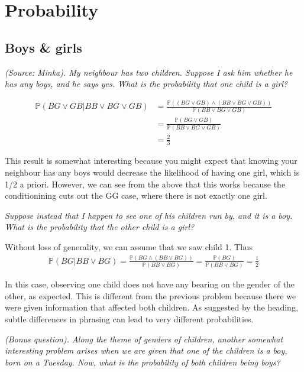\section{Probability}
\subsection{Boys \& girls}
\textit{(Source: Minka). My neighbour has two children. Suppose I ask him whether he has any boys, and he says yes. What is the probability that one child is a girl?}

\begin{align*}
\mathbb{P}(BG \lor GB | BB \lor BG \lor GB) &= \frac{\mathbb{P}((BG \lor GB) \land (BB \lor BG \lor GB))}{\mathbb{P}(BB \lor BG \lor GB)} \\
&= \frac{\mathbb{P}(BG \lor GB)}{\mathbb{P}(BB \lor BG \lor GB)} \\
&= \frac{2}{3}
\end{align*}

This result is somewhat interesting because you might expect that knowing your neighbour has any boys would decrease the likelihood of having one girl, which is 1/2 a priori. However, we can see from the above that this works because the conditionining cuts out the GG case, where there is not exactly one girl.

\textit{Suppose instead that I happen to see one of his children run by, and it is a boy. What is the probability that the other child is a girl?}

Without loss of generality, we can assume that we saw child 1. Thus
\begin{gather*}
\mathbb{P}(BG | BB \lor BG) = \frac{\mathbb{P}(BG \land (BB \lor BG))}{\mathbb{P}(BB \lor BG)} = \frac{\mathbb{P}(BG)}{\mathbb{P}(BB \lor BG)} = \frac{1}{2}
\end{gather*}

In this case, observing one child does not have any bearing on the gender of the other, as expected. This is different from the previous problem because there we were given information that affected both children. As suggested by the heading, subtle differences in phrasing can lead to very different probabilities.

\textit{(Bonus question). Along the theme of genders of children, another somewhat interesting problem arises when we are given that one of the children is a boy, born on a Tuesday. Now, what is the probability of both children being boys?}

